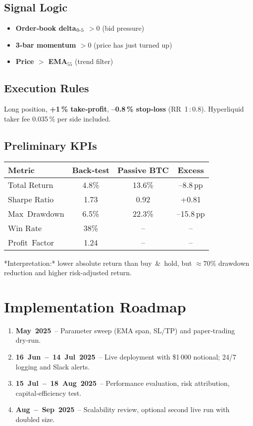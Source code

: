 \documentclass[a4paper,12pt]{article}
\begin{document}
\subsection{Signal Logic}
\begin{itemize}
  \item \textbf{Order‑book delta\(_{0{\mathchar`-}5}\) \(>\!0\)} (bid pressure)
  \item \textbf{3‑bar momentum \(>\!0\)} (price has just turned up)
  \item \textbf{Price \(>\) EMA\(_{55}\)} (trend filter)
\end{itemize}

\subsection{Execution Rules}
Long position, \textbf{+1 \% take‑profit}, \textbf{–0.8 \% stop‑loss}
(RR 1 : 0.8).  
Hyperliquid taker fee 0.035 \% per side included.

\subsection{Preliminary KPIs}
\begin{center}
\begin{tabular}{lccc}
\toprule
Metric & Back‑test & Passive BTC & Excess\\ \midrule
Total Return & 4.8\% & 13.6\% & –8.8 pp\\
Sharpe Ratio & 1.73 & 0.92 & +0.81\\
Max Drawdown & 6.5\% & 22.3\% & –15.8 pp\\
Win Rate & 38\% & – & –\\
Profit Factor & 1.24 & – & –\\ \bottomrule
\end{tabular}
\end{center}

*Interpretation:* lower absolute return than buy & hold, but
\(\approx70\%\) drawdown reduction and higher risk‑adjusted return.

\section{Implementation Roadmap}

\begin{enumerate}
  \item \textbf{May 2025} – Parameter sweep (EMA span, SL/TP) and
        paper‑trading dry‑run.
  \item \textbf{16 Jun – 14 Jul 2025} – Live deployment with
        \$1 000 notional; 24/7 logging and Slack alerts.
  \item \textbf{15 Jul – 18 Aug 2025} – Performance evaluation,
        risk attribution, capital‑efficiency test.
  \item \textbf{Aug – Sep 2025} – Scalability review,
        optional second live run with doubled size.
\end{enumerate}
\end{document}
